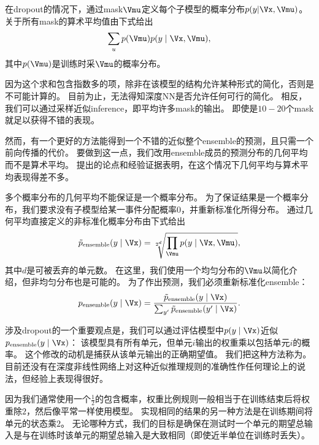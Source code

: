 在\gls{dropout}的情况下，通过\gls{mask}$\Vmu$定义每个子模型的概率分布$p(y | \Vx, \Vmu)$。
关于所有\gls{mask}的算术平均值由下式给出
\begin{align}
  \sum_{u} p(\Vmu) p(y \mid \Vx, \Vmu),
\end{align}
其中$p(\Vmu)$是训练时采$\Vmu$的概率分布。


因为这个求和包含指数多的项，除非在该模型的结构允许某种形式的简化，否则是不可能计算的。
目前为止，无法得知深度\gls{NN}是否允许任何可行的简化。
相反，我们可以通过采样近似\gls{inference}，即平均许多\gls{mask}的输出。
即使是$10-20$个\gls{mask}就足以获得不错的表现。

然而，有一个更好的方法能得到一个不错的近似整个\gls{ensemble}的预测，且只需一个前向传播的代价。
要做到这一点，我们改用\gls{ensemble}成员的预测分布的几何平均而不是算术平均。
\cite{WardeFarley+al-ICLR2014}提出的论点和经验证据表明，在这个情况下几何平均与算术平均表现得差不多。

多个概率分布的几何平均不能保证是一个概率分布。
为了保证结果是一个概率分布，我们要求没有子模型给某一事件分配概率0，并重新标准化所得分布。
通过几何平均直接定义的非标准化概率分布由下式给出
\begin{align}
\tilde{p}_{\text{ensemble}}(y \mid \Vx) = \sqrt[2^d]{\prod_{\Vmu} p(y \mid \Vx, \Vmu)},
\end{align}
其中$d$是可被丢弃的单元数。
在这里，我们使用一个均匀分布的$\Vmu$以简化介绍，但非均匀分布也是可能的。
为了作出预测，我们必须重新标准化\gls{ensemble}：
\begin{align}
p_{\text{ensemble}}(y \mid \Vx)  = \frac{\tilde{p}_{\text{ensemble}}(y \mid \Vx)}
 {\sum_{y'}\tilde{p}_{\text{ensemble}}(y' \mid \Vx) }.
\end{align}
 
涉及\gls{dropout}的一个重要观点\citep{Hinton-et-al-arxiv2012}是，我们可以通过评估模型中$p(y \mid \Vx)$近似$ p_{\text{ensemble}}(y \mid \Vx) $：
该模型具有所有单元，但单元$i$输出的权重乘以包括单元$i$的概率。
这个修改的动机是捕获从该单元输出的正确期望值。
我们把这种方法称为。
目前还没有在深度非线性网络上对这种近似推理规则的准确性作任何理论上的说法，但经验上表现得很好。

 
因为我们通常使用一个$\frac{1}{2}$的包含概率，权重比例规则一般相当于在训练结束后将权重除$2$，然后像平常一样使用模型。
实现相同的结果的另一种方法是在训练期间将单元的状态乘$2$。
无论哪种方式，我们的目标是确保在测试时一个单元的期望总输入是与在训练时该单元的期望总输入是大致相同（即使近半单位在训练时丢失）。

